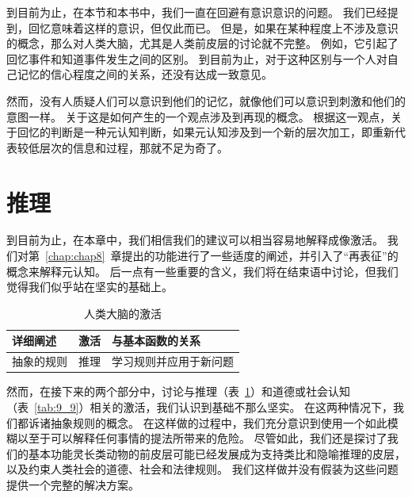 到目前为止，在本节和本书中，我们一直在回避有意识意识的问题。
我们已经提到，回忆意味着这样的意识，但仅此而已。
但是，如果在某种程度上不涉及意识的概念，那么对人类大脑，尤其是人类前皮层的讨论就不完整。
例如，它引起了回忆事件和知道事件发生之间的区别\cite{henson1999recollection}。
到目前为止，对于这种区别与一个人对自己记忆的信心程度之间的关系，还没有达成一致意见\cite{kim2009common}。


然而，没有人质疑人们可以意识到他们的记忆，就像他们可以意识到刺激和他们的意图一样。
关于这是如何产生的一个观点涉及到再现的概念。
根据这一观点，关于回忆的判断是一种元认知判断，如果元认知涉及到一个新的层次加工，即重新代表较低层次的信息和过程，那就不足为奇了。



\section{推理}

到目前为止，在本章中，我们相信我们的建议可以相当容易地解释成像激活。
我们对第~\ref{chap:chap8}~章提出的功能进行了一些适度的阐述，并引入了“再表征”的概念来解释元认知。
后一点有一些重要的含义，我们将在结束语中讨论，但我们觉得我们似乎站在坚实的基础上。

\par
\begin{table}[htbp] 
	\newcommand{\tabincell}[2]{\begin{tabular}{@{}#1@{}}#2\end{tabular}} %
	\centering
	\caption{人类大脑的激活\label{tab:9_8}}
	\renewcommand\arraystretch{1.5}	%
	\begin{tabular}{lll}
		\toprule
		详细阐述 & 激活 & 与基本函数的关系\\
		\midrule
		抽象的规则 & 推理 & 学习规则并应用于新问题  \\
		
		\bottomrule
		
	\end{tabular}%
\end{table}%


然而，在接下来的两个部分中，讨论与推理（表~\ref{tab:9_8}）和道德或社会认知（表~\ref{tab:9_9}）相关的激活，我们认识到基础不那么坚实。
在这两种情况下，我们都诉诸抽象规则的概念。
在这样做的过程中，我们充分意识到使用一个如此模糊以至于可以解释任何事情的提法所带来的危险。
尽管如此，我们还是探讨了我们的基本功能灵长类动物的前皮层可能已经发展成为支持类比和隐喻推理的皮层，以及约束人类社会的道德、社会和法律规则。
我们这样做并没有假装为这些问题提供一个完整的解决方案。


